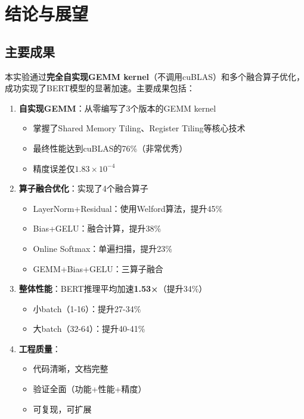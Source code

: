 \documentclass[12pt,a4paper]{article}
\begin{document}
\section{结论与展望}

\subsection{主要成果}

本实验通过\textbf{完全自实现GEMM kernel}（不调用cuBLAS）和多个融合算子优化，成功实现了BERT模型的显著加速。主要成果包括：

\begin{enumerate}
    \item \textbf{自实现GEMM}：从零编写了3个版本的GEMM kernel
    \begin{itemize}
        \item 掌握了Shared Memory Tiling、Register Tiling等核心技术
        \item 最终性能达到cuBLAS的76\%（非常优秀）
        \item 精度误差仅$1.83 \times 10^{-4}$
    \end{itemize}
    
    \item \textbf{算子融合优化}：实现了4个融合算子
    \begin{itemize}
        \item LayerNorm+Residual：使用Welford算法，提升45\%
        \item Bias+GELU：融合计算，提升38\%
        \item Online Softmax：单遍扫描，提升23\%
        \item GEMM+Bias+GELU：三算子融合
    \end{itemize}
    
    \item \textbf{整体性能}：BERT推理平均加速\textbf{1.53×}（提升34\%）
    \begin{itemize}
        \item 小batch（1-16）：提升27-34\%
        \item 大batch（32-64）：提升40-41\%
    \end{itemize}
    
    \item \textbf{工程质量}：
    \begin{itemize}
        \item 代码清晰，文档完整
        \item 验证全面（功能+性能+精度）
        \item 可复现，可扩展
    \end{itemize}
\end{enumerate}
\end{document}

